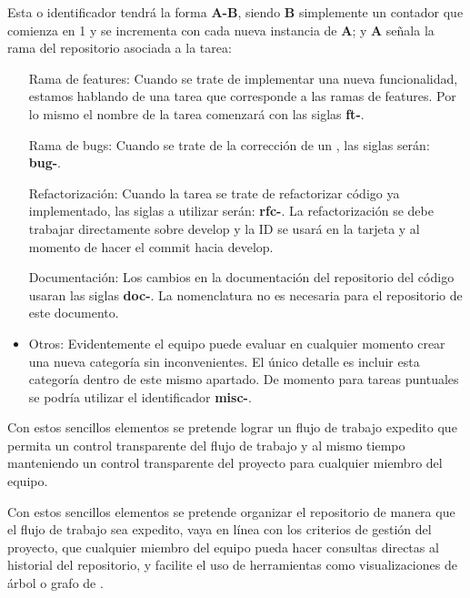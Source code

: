 Esta  o identificador tendrá la forma \textbf{A-B}, siendo \textbf{B} simplemente un contador que comienza en 1 y se incrementa con cada nueva instancia de \textbf{A}; y \textbf{A} señala la rama del repositorio asociada a la tarea:

\begin{itemize}
\item[Rama de features:] Cuando se trate de implementar una nueva funcionalidad, estamos hablando de una tarea que corresponde a las ramas de features. Por lo mismo el nombre de la tarea comenzará con las siglas \textbf{ft-}.

\item[Rama de bugs:] Cuando se trate de la corrección de un , las siglas serán: \textbf{bug-}.

\item[Refactorización:] Cuando la tarea se trate de refactorizar código ya implementado, las siglas a utilizar serán: \textbf{rfc-}. La refactorización se debe trabajar directamente sobre develop y la ID se usará en la tarjeta y al momento de hacer el commit hacia develop.

\item[Documentación:] Los cambios en la documentación del repositorio del código usaran las siglas \textbf{doc-}. La nomenclatura no es necesaria para el repositorio de este documento.

\item{Otros:} Evidentemente el equipo puede evaluar en cualquier momento crear una nueva categoría sin inconvenientes. El único detalle es incluir esta categoría dentro de este mismo apartado. De momento para tareas puntuales se podría utilizar el identificador \textbf{misc-}.
\end{itemize}

Con estos sencillos elementos se pretende lograr un flujo de trabajo expedito que permita un control transparente del flujo de trabajo y al mismo tiempo manteniendo un control transparente del proyecto para cualquier miembro del equipo.

Con estos sencillos elementos se pretende organizar el repositorio de manera que el flujo de trabajo sea expedito, vaya en línea con los criterios de gestión del proyecto, que cualquier miembro del equipo pueda hacer consultas directas al historial del repositorio, y facilite el uso de herramientas como visualizaciones de árbol o grafo de .